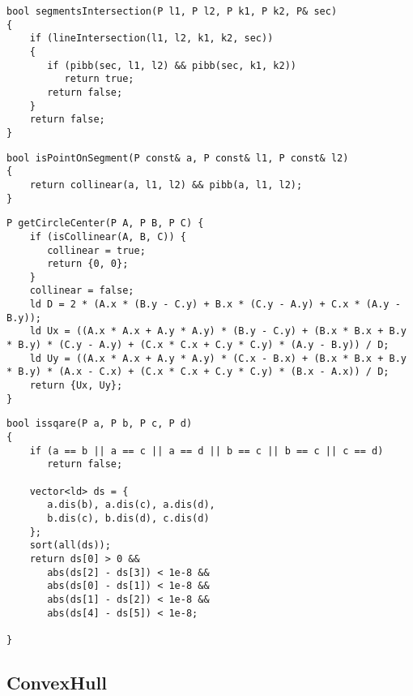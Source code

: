 \begin{lstlisting}[style=cpp]
bool segmentsIntersection(P l1, P l2, P k1, P k2, P& sec)  
{  
    if (lineIntersection(l1, l2, k1, k2, sec))  
    {  
       if (pibb(sec, l1, l2) && pibb(sec, k1, k2))  
          return true;  
       return false;  
    }  
    return false;  
}
\end{lstlisting}

\begin{lstlisting}[style=cpp]
bool isPointOnSegment(P const& a, P const& l1, P const& l2)  
{  
    return collinear(a, l1, l2) && pibb(a, l1, l2);  
}
\end{lstlisting}

\begin{lstlisting}[style=cpp]
P getCircleCenter(P A, P B, P C) {  
    if (isCollinear(A, B, C)) {  
       collinear = true;  
       return {0, 0};   
    }  
    collinear = false;  
    ld D = 2 * (A.x * (B.y - C.y) + B.x * (C.y - A.y) + C.x * (A.y - B.y));  
    ld Ux = ((A.x * A.x + A.y * A.y) * (B.y - C.y) + (B.x * B.x + B.y * B.y) * (C.y - A.y) + (C.x * C.x + C.y * C.y) * (A.y - B.y)) / D;  
    ld Uy = ((A.x * A.x + A.y * A.y) * (C.x - B.x) + (B.x * B.x + B.y * B.y) * (A.x - C.x) + (C.x * C.x + C.y * C.y) * (B.x - A.x)) / D;  
    return {Ux, Uy};  
}
\end{lstlisting}

\begin{lstlisting}[style=cpp]
bool issqare(P a, P b, P c, P d)  
{  
    if (a == b || a == c || a == d || b == c || b == c || c == d)  
       return false;  
  
    vector<ld> ds = {  
       a.dis(b), a.dis(c), a.dis(d),  
       b.dis(c), b.dis(d), c.dis(d)  
    };  
    sort(all(ds));  
    return ds[0] > 0 &&  
       abs(ds[2] - ds[3]) < 1e-8 &&  
       abs(ds[0] - ds[1]) < 1e-8 &&  
       abs(ds[1] - ds[2]) < 1e-8 &&  
       abs(ds[4] - ds[5]) < 1e-8;  
  
}
\end{lstlisting}

\subsection{ConvexHull}

